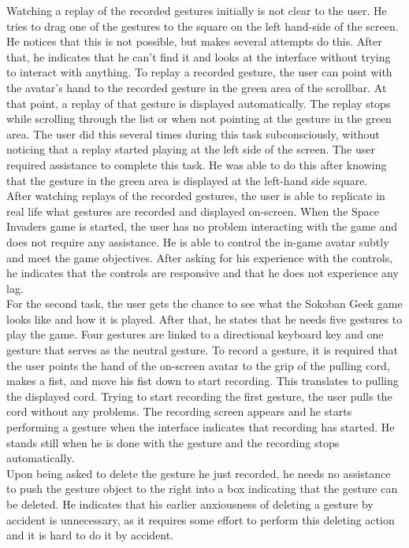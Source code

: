 Watching a replay of the recorded gestures initially is not clear to the user. He tries to drag one of the gestures to the square on the left hand-side of the screen. He notices that this is not possible, but makes several attempts do this. After that, he indicates that he can't find it and looks at the interface without trying to interact with anything. To replay a recorded gesture, the user can point with the avatar's hand to the recorded gesture in the green area of the scrollbar. At that point, a replay of that gesture is displayed automatically. The replay stops while scrolling through the list or when not pointing at the gesture in the green area. The user did this several times during this task subconsciously, without noticing that a replay started playing at the left side of the screen. The user required assistance to complete this task. He was able to do this after knowing that the gesture in the green area is displayed at the left-hand side square.\\

After watching replays of the recorded gestures, the user is able to replicate in real life what gestures are recorded and displayed on-screen. When the Space Invaders game is started, the user has no problem interacting with the game and does not require any assistance. He is able to control the in-game avatar subtly and meet the game objectives. After asking for his experience with the controls, he indicates that the controls are responsive and that he does not experience any lag.\\

For the second task, the user gets the chance to see what the Sokoban Geek game looks like and how it is played. After that, he states that he needs five gestures to play the game. Four gestures are linked to a directional keyboard key and one gesture that serves as the neutral gesture. To record a gesture, it is required that the user points the hand of the on-screen avatar to the grip of the pulling cord, makes a fist, and move his fist down to start recording. This translates to pulling the displayed cord. Trying to start recording the first gesture, the user pulls the cord without any problems. The recording screen appears and he starts performing a gesture when the interface indicates that recording has started. He stands still when he is done with the gesture and the recording stops automatically.\\

Upon being asked to delete the gesture he just recorded, he needs no assistance to push the gesture object to the right into a box indicating that the gesture can be deleted. He indicates that his earlier anxiousness of deleting a gesture by accident is unnecessary, as it requires some effort to perform this deleting action and it is hard to do it by accident.\\

